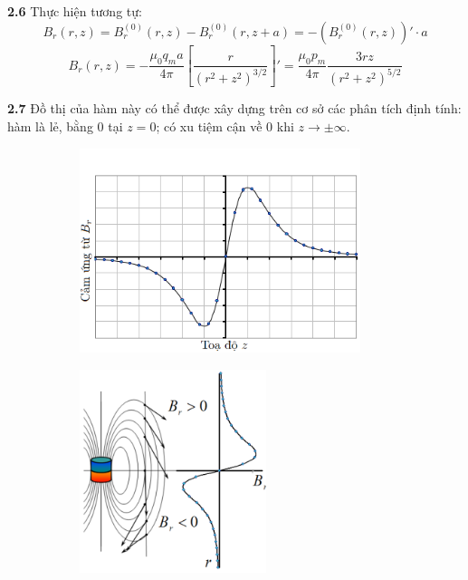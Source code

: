 \noindent\textbf{2.6} Thực hiện tương tự:
\begin{equation*}
  B_r(r, z) = B^{(0)}_r(r, z) - B^{(0)}_r(r, z + a) = -\left(B^{(0)}_r(r, z)\right)' \cdot a
\end{equation*}
\begin{equation*}
  B_r(r, z) = -\frac{\mu_0 q_m a}{4\pi}  \left[ \frac{r}{(r^2 + z^2)^{3/2}} \right]'
  = \frac{\mu_0 p_m}{4\pi} \frac{3rz}{(r^2 + z^2)^{5/2}}
\end{equation*}

\noindent\textbf{2.7} Đồ thị của hàm này có thể được xây dựng trên cơ sở các phân tích định tính: hàm là lẻ, bằng 0 tại $z = 0$; có xu tiệm cận về 0 khi $z \to \pm \infty$.\\
\begin{figure}[H]
  \centering
  \begin{subfigure}[b]{0.49\textwidth}
    \centering
    \includegraphics[width=0.9\textwidth]{Figures/Solutions/Fig 2.5.png}
  \end{subfigure}
  \hfill
  \begin{subfigure}[b]{0.49\textwidth}
    \centering
    \includegraphics[width=0.6\textwidth]{Figures/Solutions/Fig 2.6.png}
  \end{subfigure}
\end{figure}


